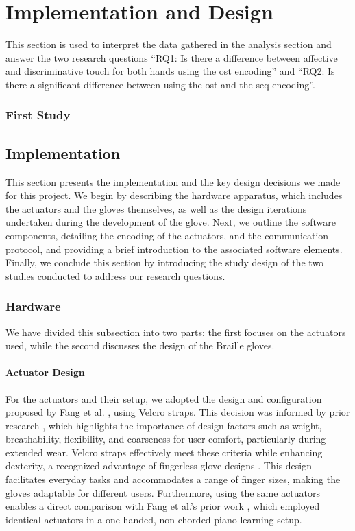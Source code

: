 \chapter{Implementation and Design}
\label{ch:Evaluation}

This section is used to interpret the data gathered in the analysis section and answer the two research questions \enquote{RQ1: Is there a difference between affective and discriminative touch for
both hands using the \gls{ost} encoding} and
\enquote{RQ2: Is there a significant
difference between using the \gls{ost} and the \gls{seq} encoding}.


\subsection{First Study}

\label{ch:Implementation}

\section{Implementation}
This section presents the implementation and the key design decisions we made for this project.
We begin by describing the hardware apparatus, which includes the actuators and the gloves themselves, as well as the design iterations undertaken during the development of the glove.
Next, we outline the software components, detailing the encoding of the actuators, and the communication protocol, and providing a brief introduction to the associated software elements.
Finally, we conclude this section by introducing the study design of the two studies conducted to address our research questions.


\subsection{Hardware}
We have divided this subsection into two parts: the first focuses on the actuators used, while the second discusses the design of the Braille gloves.

\subsubsection{Actuator Design}
For the actuators and their setup, we adopted the design and configuration proposed by Fang et al. \cite{Fang2023}, using Velcro straps. This decision was informed by prior research \cite{Markow2010, Kohlsdorf2010, Huang2010, Fang2023a}, which highlights the importance of design factors such as weight, breathability, flexibility, and coarseness for user comfort, particularly during extended wear. Velcro straps effectively meet these criteria while enhancing dexterity, a recognized advantage of fingerless glove designs \cite{Huang2008}. This design facilitates everyday tasks and accommodates a range of finger sizes, making the gloves adaptable for different users. Furthermore, using the same actuators enables a direct comparison with Fang et al.’s prior work \cite{Fang2023}, which employed identical actuators in a one-handed, non-chorded piano learning setup.

